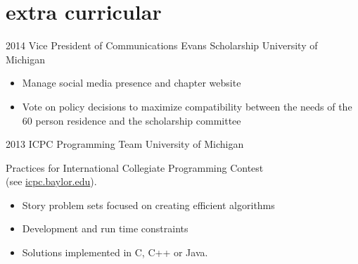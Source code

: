 \section{extra curricular}

\begin{entrylist}
\entry
{2014}
{Vice President of Communications}
{Evans Scholarship University of Michigan}
{
	\vspace{-4mm}%
	\begin{itemize}
		\item Manage social media presence and chapter website
		\item Vote on policy decisions to maximize compatibility between the needs of the 60 person residence and the scholarship committee
	\end{itemize}
}
\entry
{2013}
{ICPC Programming Team}
{University of Michigan}
{
	Practices for International Collegiate Programming Contest\\
	(see \href{http://icpc.baylor.edu/}{icpc.baylor.edu}).
	\begin{itemize}
		\item Story problem sets focused on creating efficient algorithms
		\item Development and run time constraints
		\item Solutions implemented in C, C++ or Java.
	\end{itemize}
}
\end{entrylist}
